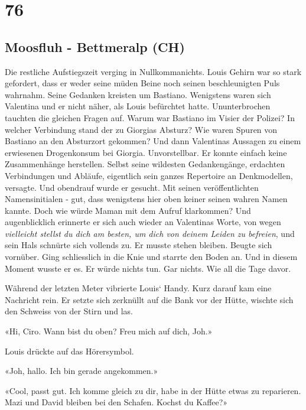 \chapter{76}

\section{Moosfluh - Bettmeralp (CH)}



Die restliche Aufstiegszeit verging in Nullkommanichts. Louis Gehirn
war so stark gefordert, dass er weder seine müden Beine noch seinen
beschleunigten Puls wahrnahm. Seine Gedanken kreisten um
Bastiano. Wenigstens waren sich Valentina und er nicht näher, als Louis
befürchtet hatte. Ununterbrochen tauchten die gleichen Fragen auf. Warum war Bastiano im
Visier der Polizei? In welcher Verbindung stand der zu Giorgias Absturz?
Wie waren Spuren von Bastiano an den Absturzort gekommen? Und dann
Valentinas Aussagen zu einem erwiesenen Drogenkonsum bei Giorgia.
Unvorstellbar. Er konnte einfach keine Zusammenhänge herstellen. Selbst seine
wildesten Gedankengänge, erdachten Verbindungen und Abläufe, eigentlich
sein ganzes Repertoire an Denkmodellen, versagte. Und obendrauf wurde er gesucht. Mit seinen veröffentlichten Namensinitialen - gut, dass wenigstens hier oben keiner seinen wahren Namen kannte. Doch wie würde Maman mit dem Aufruf klarkommen? Und augenblicklich erinnerte er sich auch wieder an Valentinas
Worte, von wegen \emph{vielleicht stellst du dich am besten,
um dich von deinem Leiden zu befreien}, und sein Hals schnürte sich vollends 
zu. Er musste stehen bleiben. Beugte sich vornüber. Ging schliesslich in
die Knie und starrte den Boden an. Und in diesem Moment wusste er es. Er
würde nichts tun. Gar nichts. Wie all die Tage davor.

\sectionbreak

Während der letzten Meter vibrierte Louis` Handy. Kurz darauf kam eine Nachricht rein. 
Er setzte sich zerknüllt auf die Bank vor der Hütte, wischte sich den Schweiss von der Stirn und las. 

«Hi, Ciro. Wann bist du oben? Freu mich auf dich, Joh.»

Louis drückte auf das Hörersymbol.

«Joh, hallo. Ich bin gerade angekommen.»

«Cool, passt gut. Ich komme gleich zu dir, habe in der Hütte etwas zu reparieren.
Mazi und David bleiben bei den Schafen. Kochst du Kaffee?»

